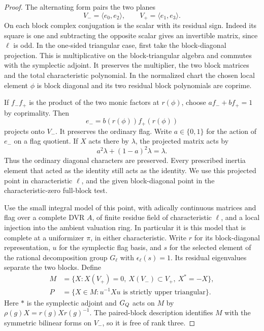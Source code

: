 \begin{proof}

The alternating form pairs the two planes
\[
          V_-=\langle e_0,e_2\rangle,\qquad
          V_+=\langle e_1,e_3\rangle .
\]
On each block complex conjugation is the scalar with its residual
sign. Indeed its square is one and subtracting the opposite scalar
gives an invertible matrix, since \(\ell\) is odd.
In the one-sided triangular case, first take the block-diagonal
projection. This is multiplicative on the block-triangular algebra
and commutes with the symplectic adjoint. It preserves the multiplier,
the two block matrices and the total characteristic polynomial. In
the normalized chart the chosen local element \(\phi\) is block
diagonal and its two residual block polynomials are coprime.

If \(f_-f_+\) is the product of the two monic factors
at \(r(\phi)\), choose \(af_-+bf_+=1\) by coprimality.
Then
\[
                      e_-=b(r(\phi))f_+(r(\phi))
\]
projects onto \(V_-\).
It preserves the ordinary flag. Write \(a\in\{0,1\}\) for the action of \(e_-\) on a flag quotient. If \(X\) acts there by \(\lambda\), the projected matrix acts by
\[
 a^2\lambda+(1-a)^2\lambda=\lambda .
\]
Thus the ordinary diagonal characters are preserved. Every prescribed inertia element that acted
as the identity still acts as the identity. We use this projected
point in characteristic \(\ell\), and the given block-diagonal point
in the characteristic-zero full-block test.


Use the small integral model of this point, with adically
continuous matrices and flag over a complete DVR \(A\), of finite
residue field of characteristic \(\ell\), and a local injection
into the ambient valuation ring. In particular it is this model
that is complete at a uniformizer \(\pi\), in either characteristic.
Write \(r\) for its block-diagonal representation, \(u\) for
the symplectic flag basis, and \(s\) for the selected element of
the rational decomposition group \(G_\ell\) with
\(\epsilon_\ell(s)=1\). Its residual eigenvalues separate the two
blocks. Define
\[
 \begin{aligned}
 M&=\{X: X(V_+)=0,\ X(V_-)\subset V_+,\ X^*=-X\},\\
 P&=\{X\in M:u^{-1}Xu\text{ is strictly upper triangular}\}.
 \end{aligned}
\]
Here \(*\) is the symplectic adjoint and \(G_Q\) acts on \(M\) by
\(\rho(g)X=r(g)Xr(g)^{-1}\). The paired-block description identifies
\(M\) with the symmetric bilinear forms on \(V_-\), so it is free
of rank three.


\end{proof}
